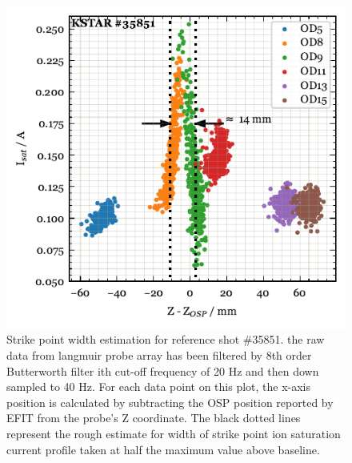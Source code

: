 \begin{figure}[!ht]
 \centering
 \includegraphics[width=\linewidth]{figures/StrikePointWidth.pdf}
 \caption{
Strike point width estimation for reference shot \#35851.
the raw data from langmuir probe array has been filtered by 8th order Butterworth filter ith cut-off frequency of 20 Hz and then down sampled to 40 Hz.
For each data point on this plot, the x-axis position is calculated by subtracting the \ac{OSP} position reported by EFIT from the probe's Z coordinate.
The black dotted lines represent the rough estimate for width of strike point ion saturation current profile taken at half the maximum value above baseline.
}
 \label{fig:strike_point_width}
\end{figure}